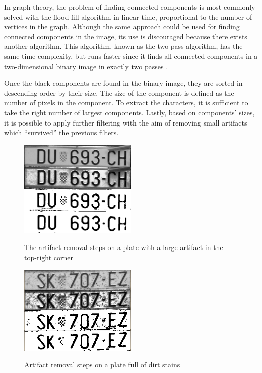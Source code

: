 \documentclass[times, utf8, zavrsni]{fer}
\begin{document}
In graph theory, the problem of finding connected components is most commonly
solved with the flood-fill algorithm in linear time, proportional to the number
of vertices in the graph. Although the same approach could be used for finding
connected components in the image, its use is discouraged because there exists
another algorithm. This algorithm, known as the two-pass algorithm, has the same
time complexity, but runs faster since it finds all connected components in a
two-dimensional binary image in exactly two passes \citep{two-pass-algorithm}.

Once the black components are found in the binary image, they are sorted in
descending order by their size. The size of the component is defined as the
number of pixels in the component. To extract the characters, it is sufficient
to take the right number of largest components. Lastly, based on components'
sizes, it is possible to apply further filtering with the aim of removing small
artifacts which ``survived'' the previous filters.

\begin{figure}[htb]
\caption{The artifact removal steps on a plate with a large
artifact in the top-right corner}
\centering
\includegraphics[width=0.5\textwidth]{images/artifact-removal-01}
\label{fig:artifact-removal-01}
\end{figure}

\begin{figure}[htb]
\caption{Artifact removal steps on a plate full of
dirt stains}
\centering
\includegraphics[width=0.5\textwidth]{images/artifact-removal-02}
\label{fig:artifact-removal-02}
\end{figure}
\end{document}
